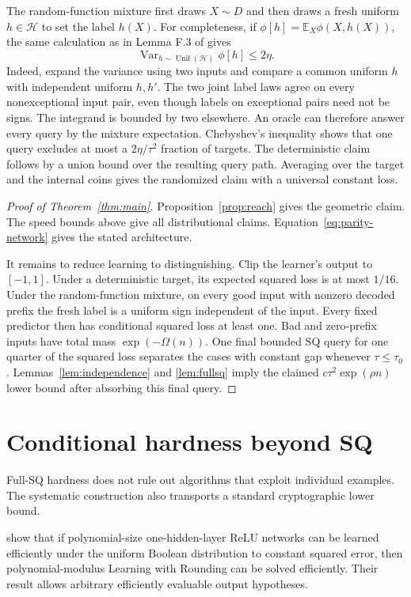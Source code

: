 \documentclass{article}
\theoremstyle{definition}
\theoremstyle{remark}
\newcommand{\cH}{\mathcal H}
\newcommand{\1}{\mathbf 1}
\begin{document}
The random-function mixture first draws $X\sim D$ and then draws a fresh uniform $h\in\cH$ to set the label $h(X)$. For completeness, if $\phi[h]=\mathbb E_X\phi(X,h(X))$, the same calculation as in Lemma F.3 of \citet{chen2022noisefree} gives \[ \operatorname{Var}_{h\sim\operatorname{Unif}(\cH)}\phi[h]\leq2\eta. \] Indeed, expand the variance using two inputs and compare a common uniform $h$ with independent uniform $h,h'$. The two joint label laws agree on every nonexceptional input pair, even though labels on exceptional pairs need not be signs. The integrand is bounded by two elsewhere. An oracle can therefore answer every query by the mixture expectation. Chebyshev's inequality shows that one query excludes at most a $2\eta/\tau^2$ fraction of targets. The deterministic claim follows by a union bound over the resulting query path. Averaging over the target and the internal coins gives the randomized claim with a universal constant loss.

\begin{proof}[Proof of Theorem~\ref{thm:main}]
Proposition~\ref{prop:reach} gives the geometric claim. The speed bounds above give all distributional claims. Equation~\eqref{eq:parity-network} gives the stated architecture.

It remains to reduce learning to distinguishing. Clip the learner's output to $[-1,1]$. Under a deterministic target, its expected squared loss is at most $1/16$. Under the random-function mixture, on every good input with nonzero decoded prefix the fresh label is a uniform sign independent of the input. Every fixed predictor then has conditional squared loss at least one. Bad and zero-prefix inputs have total mass $\exp(-\Omega(n))$. One final bounded SQ query for one quarter of the squared loss separates the cases with constant gap whenever $\tau\leq\tau_0$. Lemmas~\ref{lem:independence} and \ref{lem:fullsq} imply the claimed $c\tau^2\exp(\rho n)$ lower bound after absorbing this final query.
\end{proof}

\section{Conditional hardness beyond SQ}
\label{sec:lwr}

Full-SQ hardness does not rule out algorithms that exploit individual examples. The systematic construction also transports a standard cryptographic lower bound.

\citet{chen2022noisefree} show that if polynomial-size one-hidden-layer ReLU networks can be learned efficiently under the uniform Boolean distribution to constant squared error, then polynomial-modulus Learning with Rounding can be solved efficiently. Their result allows arbitrary efficiently evaluable output hypotheses.
\end{document}
